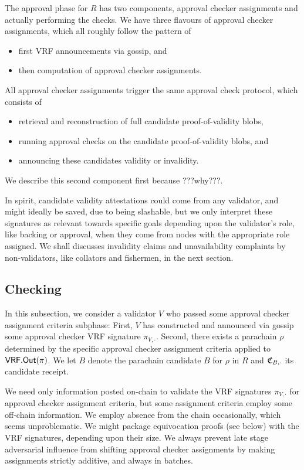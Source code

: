 The approval phase for $R$ has two components, approval checker assignments and actually performing the checks.  We have three flavours of approval checker assignments, which all roughly follow the pattern of
\begin{itemize}
\item first VRF announcements via gossip, and
\item then computation of approval checker assignments.
\end{itemize}
\noindent 
All approval checker assignments trigger the same approval check protocol, which consists of
\begin{itemize}
\item retrieval and reconstruction of full candidate proof-of-validity blobs, 
\item running approval checks on the candidate proof-of-validity blobs, and 
\item announcing these candidates validity or invalidity.
\end{itemize}
We describe this second component first because ???why???.

In spirit, candidate validity attestations could come from any validator, and might ideally be saved, due to being slashable, but we only interpret these signatures as relevant towards specific goals depending upon the validator's role, like backing or approval, when they come from nodes with the appropriate role assigned.  We shall discusses invalidity claims and unavailability complaints by non-validators, like collators and fishermen, in the next section.


\subsection{Checking}
\label{sec:approcal_checks}

In this subsection, we consider a validator $V$ who passed some approval checker assignment criteria subphase:  First, $V$ has constructed and announced via gossip some approval checker VRF signature $\pi_{V,\cdot}$.  Second, there exists a parachain $\rho$ determined by the specific approval checker assignment criteria applied to $\mathsf{VRF}.\mathsf{Out}(\pi)$.  We let $B$ denote the parachain candidate $B$ for $\rho$ in $R$ and $\mathfrak{C}_{B,\cdot}$ its candidate receipt.  

We need only information posted on-chain to validate the VRF signatures $\pi_{V,\cdot}$ for approval checker assignment criteria, but some assignment criteria employ some off-chain information.  We employ absence from the chain occasionally, which seems unproblematic.  We might package equivocation proofs (see below) with the VRF signatures, depending upon their size.  We always prevent late stage adversarial influence from shifting approval checker assignments by making assignments strictly additive, and always in batches.
%


